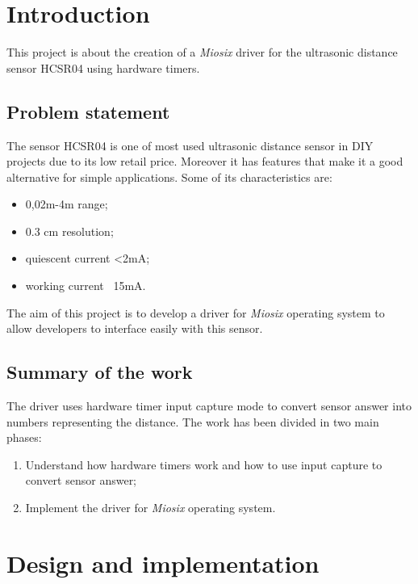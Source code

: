 \section{Introduction}
This project is about the creation of a \textit{Miosix} driver for the ultrasonic distance sensor HCSR04 using hardware timers. 
\subsection{Problem statement}
The sensor HCSR04 is one of most used ultrasonic distance sensor in DIY projects due to its low retail price. Moreover it has features that make it a good alternative for simple applications. Some of its characteristics are:
\begin{itemize}
\item 0,02m-4m range;
\item 0.3 cm resolution;
\item quiescent current <2mA;
\item working current ~15mA.
\end{itemize}  
The aim of this project is to develop a driver for \textit{Miosix} operating system to allow developers to interface easily with this sensor.
\subsection{Summary of the work}
The driver uses hardware timer input capture mode to convert sensor answer into numbers representing the distance. The work has been divided in two main phases:
\begin{enumerate}
\item Understand how hardware timers work and how to use input capture to convert sensor answer;
\item Implement the driver for \textit{Miosix} operating system.
\end{enumerate}

\pagebreak

\section{Design and implementation}

